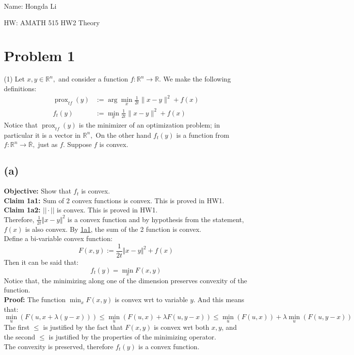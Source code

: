 \documentclass[]{article}
\begin{document}
\hspace{-1.8em}
Name: Hongda Li
\par\hspace{-1.8em}
HW: AMATH 515 HW2 Theory

\section*{Problem 1}
    (1) Let $x, y \in \mathbb{R}^{n},$ and consider a function $f: \mathbb{R}^{n} \rightarrow \mathbb{\mathbb { R }}$. We make the following definitions:
    $$
    \begin{aligned}
    \operatorname{prox}_{t f}(y) &:=\arg \min _{x} \frac{1}{2 t}\|x-y\|^{2}+f(x) \\
    f_{t}(y) &:=\min _{x} \frac{1}{2 t}\|x-y\|^{2}+f(x)
    \end{aligned}
    $$
    Notice that $\operatorname{prox}_{t f}(y)$ is the minimizer of an optimization problem; in particular it is a vector in $\mathbb{R}^{n},$ On the other hand $f_{t}(y)$ is a function from $f: \mathbb{R}^{n} \rightarrow \overline{\mathbb{R}},$ just as $f$.
    Suppose $f$ is convex.
    \subsection*{(a)}
        \textbf{Objective: } Show that $f_t$ is convex. 
        \\
        \textbf{Claim 1a1: \label{1a1}} Sum of 2 convex functions is convex. This is proved in HW1. 
        \\
        \textbf{Claim 1a2: } $||\cdot||$ is convex. This is proved in HW1. 
        \\
        Therefore, $\frac{1}{2t}\Vert x - y\Vert^2$ is a convex function and by hypothesis from the statement, $f(x)$ is also convex. By \hyperref[1a1]{1a1}, the sum of the 2 function is convex. 
        \\
        Define a bi-variable convex function: 
        $$
            F(x, y) := \frac{1}{2t}\Vert x - y\Vert^2 + f(x)
        $$
        Then it can be said that: 
        $$
            f_t(y) = \min_x F(x, y)
        $$
        Notice that, the minimizing along one of the dimension preserves convexity of the function.
        \\
        \textbf{Proof: }The function $\min_x F(x,y)$ is convex wrt to variable $y$. And this means that: 
        $$
            \min_u(F(u, x + \lambda(y - x))) \le 
            \min_u(F(u, x) + \lambda F(u, y - x)) \le 
            \min_u(F(u, x)) + \lambda \min_u(F(u, y - x))
        $$
        The first $\le$ is justified by the fact that $F(x,y)$ is convex wrt both $x, y$, and the second $\le$ is justified by the properties of the minimizing operator. 
        \\
        The convexity is preserved, therefore $f_t(y)$ is a convex function. 
\end{document}
